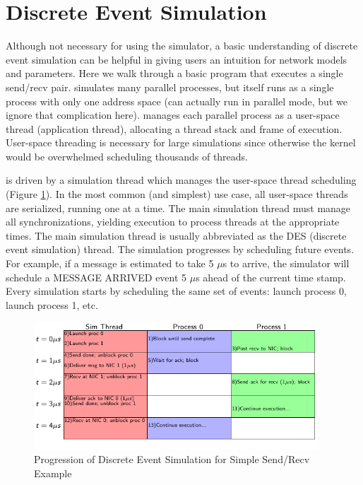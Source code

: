 
\section{Discrete Event Simulation}
\label{sec:tutorial:des}
Although not necessary for using the simulator, a basic understanding of discrete event simulation can be helpful in giving users an intuition for network models and parameters.
Here we walk through a basic program that executes a single send/recv pair.
\sstmacro simulates many parallel processes, but itself runs as a single process with only one address space (\sstmacro can actually run in parallel mode, but we ignore that complication here).
\sstmacro manages each parallel process as a user-space thread (application thread), allocating a thread stack and frame of execution.
User-space threading is necessary for large simulations since otherwise the kernel would be overwhelmed scheduling thousands of threads.

\sstmacro is driven by a simulation thread which manages the user-space thread scheduling (Figure \ref{fig:des}).
In the most common (and simplest) use case, all user-space threads are serialized, running one at a time.
The main simulation thread must manage all synchronizations, yielding execution to process threads at the appropriate times.
The main simulation thread is usually abbreviated as the DES (discrete event simulation) thread.
The simulation progresses by scheduling future events.  
For example, if a message is estimated to take 5 $\mu$s to arrive,
the simulator will schedule a MESSAGE ARRIVED event 5 $\mu$s ahead of the current time stamp.
Every simulation starts by scheduling the same set of events: launch process 0, launch process 1, etc.

\begin{figure}[h!]
\centering
\includegraphics[width=0.95\textwidth]{figures/tikz/des/events.pdf}
\caption{Progression of Discrete Event Simulation for Simple Send/Recv Example}
\label{fig:des}
\end{figure}

